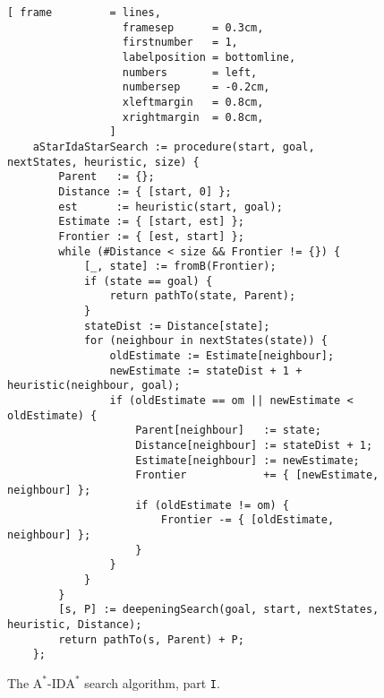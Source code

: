\begin{figure}[!ht]
\centering
\begin{Verbatim}[ frame         = lines,
                  framesep      = 0.3cm,
                  firstnumber   = 1,
                  labelposition = bottomline,
                  numbers       = left,
                  numbersep     = -0.2cm,
                  xleftmargin   = 0.8cm,
                  xrightmargin  = 0.8cm,
                ]
    aStarIdaStarSearch := procedure(start, goal, nextStates, heuristic, size) {
        Parent   := {};
        Distance := { [start, 0] };
        est      := heuristic(start, goal);
        Estimate := { [start, est] };
        Frontier := { [est, start] };
        while (#Distance < size && Frontier != {}) {
            [_, state] := fromB(Frontier);
            if (state == goal) {
                return pathTo(state, Parent);
            }
            stateDist := Distance[state];
            for (neighbour in nextStates(state)) {
                oldEstimate := Estimate[neighbour];
                newEstimate := stateDist + 1 + heuristic(neighbour, goal);
                if (oldEstimate == om || newEstimate < oldEstimate) {
                    Parent[neighbour]   := state;
                    Distance[neighbour] := stateDist + 1;
                    Estimate[neighbour] := newEstimate;
                    Frontier            += { [newEstimate, neighbour] };
                    if (oldEstimate != om) {
                        Frontier -= { [oldEstimate, neighbour] };
                    }
                }
            }
        }
        [s, P] := deepeningSearch(goal, start, nextStates, heuristic, Distance);
        return pathTo(s, Parent) + P;
    };
\end{Verbatim}
\vspace*{-0.3cm}
\caption{The $\mathrm{A}^*$-$\mathrm{IDA}^*$ search algorithm, part \texttt{I}.}
\label{fig:a-star-ida-star.stlx-1}
\end{figure}


